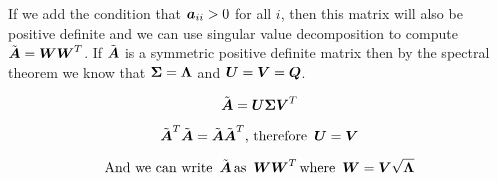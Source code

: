 \documentclass{article}
\begin{document}
If we add the condition that $\boldsymbol{a}_{ii} > 0$ for all $i$, then this matrix will also be positive definite and we can use singular value decomposition to compute $\tilde{\boldsymbol{A}} = \boldsymbol{W}\boldsymbol{W}^T$. If $\tilde{\boldsymbol{A}}$ is a symmetric positive definite matrix then by the spectral theorem we know that $\boldsymbol{\Sigma} = \boldsymbol{\Lambda}$ and $\boldsymbol{U} = \boldsymbol{V} = \boldsymbol{Q}$.


\begin{equation*}
\tilde{\boldsymbol{A}} = \boldsymbol{U}\boldsymbol{\Sigma}\boldsymbol{V}^T
\end{equation*}

\begin{equation*}
\tilde{\boldsymbol{A}}^T\tilde{\boldsymbol{A}} = \tilde{\boldsymbol{A}}\tilde{\boldsymbol{A}}^T  \text{, therefore } \, \boldsymbol{U} = \boldsymbol{V}
\end{equation*}


\begin{equation*}
\text{And we can write } \, \tilde{\boldsymbol{A}} \, \text{as } \, \boldsymbol{W}\boldsymbol{W}^T \, \text{where } \, \boldsymbol{W} = \boldsymbol{V} \sqrt{\boldsymbol{\Lambda}}
\end{equation*}
\end{document}
